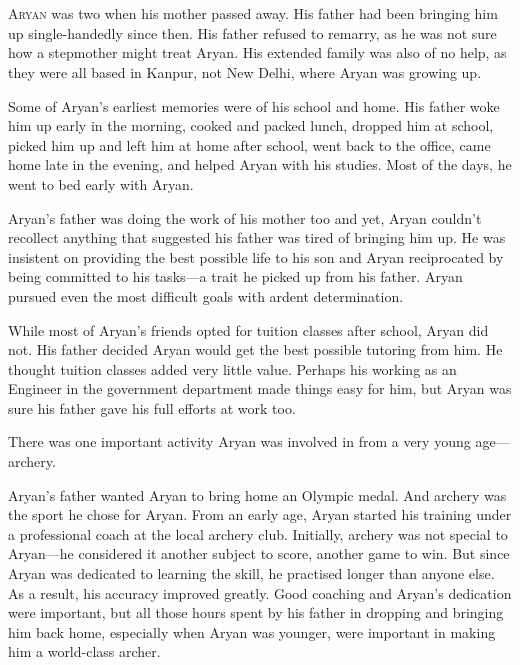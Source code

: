 \chapter{}

\lettrine{A}{ryan} was two when his mother passed away. His father had been bringing him up
single-handedly since then. His father refused to remarry, as he was not sure how a
stepmother might treat Aryan. His extended family was also of no help, as
they were all based in Kanpur, not New Delhi, where Aryan was growing up.

Some of Aryan's earliest memories were of his school and home. His father woke
him up early in the morning, cooked and packed lunch, dropped him at school,
picked him up and left him at home after school, went back to the office, came home
late in the evening, and helped Aryan with his studies. Most of the days, he went to bed
early with Aryan.

Aryan's father was doing the work of his mother too and yet, Aryan couldn't
recollect anything that suggested his father was tired of bringing him up. He
was insistent on providing the best possible life to his son and Aryan
reciprocated by being committed to his tasks—a trait he picked up from his
father. Aryan pursued even the most difficult goals with ardent determination.

While most of Aryan's friends opted for tuition classes after school, Aryan did
not. His father decided Aryan would get the best possible tutoring from him. He
thought tuition classes added very little value. Perhaps his working as an
Engineer in the government department made things easy for him, but Aryan was
sure his father gave his full efforts at work too.

There was one important activity Aryan was involved in from a very young age—archery.

Aryan's father wanted Aryan to bring home an Olympic medal. And archery was the
sport he chose for Aryan. From an early age, Aryan started his training under a
professional coach at the local archery club. Initially, archery was not special
to Aryan—he considered it another subject to score, another game to win.
But since Aryan was dedicated to learning the skill, he practised longer than
anyone else. As a result, his accuracy improved greatly. Good coaching and
Aryan's dedication were important, but all those hours spent by his father in
dropping and bringing him back home, especially when Aryan was younger, were
important in making him a world-class archer.

